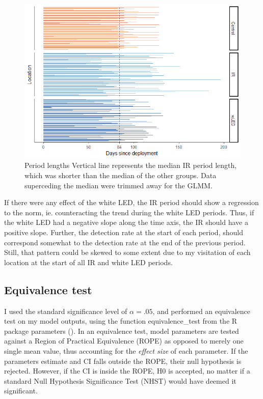 \begin{figure}
	\centering
	\includegraphics[scale=.8]{../R/glmm_sp_files/figure-html/period-length-wControl-1.png}
	\caption[Period lengths]
	{Period lengths %
	Vertical line represents the median IR period length, which was shorter than the median of the other groups. Data superceding the median were trimmed away for the GLMM. \label{fig:median_period}}
\end{figure}

If there were any effect of the white LED, the IR period should show a regression to the norm, ie. counteracting the trend during the white LED periods.
Thus, if the white LED had a negative slope along the time axis, the IR should have a positive slope.
Further, the detection rate at the start of each period, should correspond somewhat to the detection rate at the end of the previous period. Still, that pattern could be skewed to some extent due to my visitation of each location at the start of all IR and white LED periods.






\subsection*{Equivalence test}
I used the standard significance level of $\alpha = .05$, and performed an equivalence test on my model outputs, using the function equivalence\_test from the R package parameters ().%
In an equivalence test, model parameters are tested against a Region of Practical Equivalence (ROPE) as opposed to merely one single mean value, thus accounting for the \emph{effect size} of each parameter.
If the parameters estimate and CI falls outside the ROPE, their null hypothesis is rejected. However, if the CI is inside the ROPE, H0 is accepted, no matter if a standard Null Hypothesis Significance Test (NHST) would have deemed it significant.

